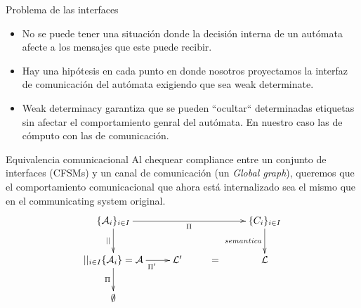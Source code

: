 \documentclass[10pt,xcolor={table,dvipsnames},t]{beamer}
\begin{document}
\begin{frame}{Problema de las interfaces}
\begin{itemize}
\item No se puede tener una situación donde la decisión interna de un autómata afecte a los mensajes que este puede recibir.
\item Hay una hipótesis en cada punto en donde nosotros proyectamos la interfaz de comunicación del autómata exigiendo que sea weak determinate.
\item Weak determinacy \cite{milner89} garantiza que se pueden ``ocultar`` determinadas etiquetas sin afectar el comportamiento genral del autómata. En nuestro caso las de cómputo con las de comunicación.
\end{itemize} 
\vspace{\fill}
\end{frame}

\begin{frame}{Equivalencia comunicacional}
 \vspace{\fill}
Al chequear compliance entre un conjunto de interfaces (CFSMs) y un canal de comunicación (un \emph{Global graph}), queremos que el comportamiento comunicacional que ahora está internalizado sea el mismo que en el communicating system original. 
 \vspace{\fill}
$$
\xymatrix{   
	\{\mathcal{A}_i\}_{i \in I} \ar[rrr]_{\Pi} \ar[d]_{||} & & & \{C_i\}_{i \in I}  \ar[d]_{semantica}  \\
	  {||_{i \in I}\{\mathcal{A}_i\}= \mathcal{A}} \ar[r]_{\ \ \ \ \Pi'} \ar[d]_{\Pi} & \mathcal{L}' & = & {\mathcal{L}}  \\
	  \emptyset
}
$$
 \vspace{\fill}
\end{frame}
\end{document}
